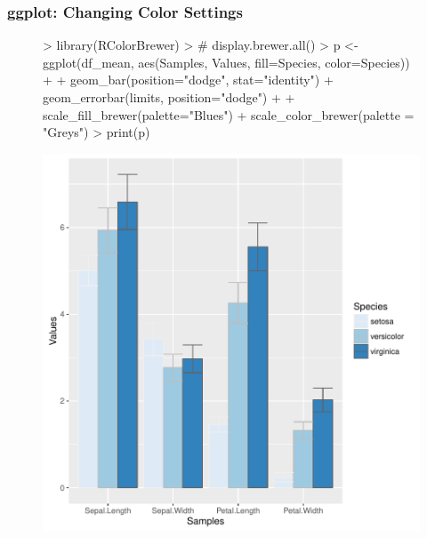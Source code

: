 \documentclass{beamer}
\begin{document}
\begin{frame}[containsverbatim]  
	\frametitle{ggplot: Changing Color Settings}
\tiny
\begin{figure}
  \centering
\begin{Schunk}
\begin{Sinput}
> library(RColorBrewer)
> # display.brewer.all() 
> p <- ggplot(df_mean, aes(Samples, Values, fill=Species, color=Species)) +
+             geom_bar(position="dodge", stat="identity") + geom_errorbar(limits, position="dodge") + 
+             scale_fill_brewer(palette="Blues") + scale_color_brewer(palette = "Greys") 
> print(p) 
\end{Sinput}
\end{Schunk}
\includegraphics{fig--061}
\label{fig:qplotscatter}
\end{figure}
\end{frame}
\end{document}
